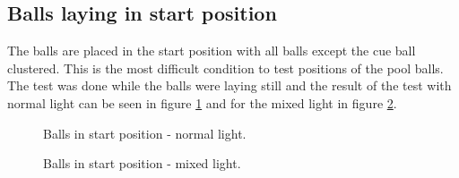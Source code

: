 \subsection{Balls laying in start position}
The balls are placed in the start position with all balls except the cue ball clustered. This is the most difficult condition to test positions of the pool balls. The test was done while the balls were laying still and the result of the test with normal light can be seen in figure \ref{fig:poolposstart} and for the mixed light in figure \ref{fig:poolposstart2}.

\begin{figure}[htpb]
  \centering
\quad
   \caption{Balls in start position - normal light.}
  \label{fig:poolposstart}
\end{figure}

\begin{figure}[htpb]
  \centering
\quad
\quad
   \caption{Balls in start position - mixed light.}
  \label{fig:poolposstart2}
\end{figure}

